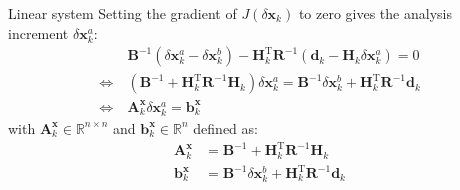\documentclass[8pt]{beamer}
\begin{document}
\begin{frame}{Linear system}
Setting the gradient of $J(\delta \mathbf{x}_k)$ to zero gives the analysis increment $\delta \mathbf{x}^a_k$:
\begin{align}
\label{eq:inc}
& \ \mathbf{B}^{-1} \left(\delta \mathbf{x}^a_k - \delta \mathbf{x}^b_k\right) - \mathbf{H}_k^\mathrm{T} \mathbf{R}^{-1} \left(\mathbf{d}_k - \mathbf{H}_k \delta \mathbf{x}^a_k\right) = 0 \nonumber \\
\Leftrightarrow & \ \left(\mathbf{B}^{-1} + \mathbf{H}_k^\mathrm{T} \mathbf{R}^{-1} \mathbf{H}_k\right) \delta \mathbf{x}^a_k = \mathbf{B}^{-1} \delta \mathbf{x}^b_k + \mathbf{H}_k^\mathrm{T} \mathbf{R}^{-1} \mathbf{d}_k \nonumber \\
\Leftrightarrow & \ \boxed{\mathbf{A}^\mathbf{x}_k \delta \mathbf{x}^a_k = \mathbf{b}^\mathbf{x}_k}
\end{align}
with $\mathbf{A}^\mathbf{x}_k \in \mathbb{R}^{n \times n}$ and $\mathbf{b}^\mathbf{x}_k \in \mathbb{R}^{n}$ defined as:
\begin{align}
\mathbf{A}^\mathbf{x}_k & = \mathbf{B}^{-1} + \mathbf{H}_k^\mathrm{T} \mathbf{R}^{-1} \mathbf{H}_k \\
\mathbf{b}^\mathbf{x}_k & = \mathbf{B}^{-1} \delta \mathbf{x}^b_k + \mathbf{H}_k^\mathrm{T} \mathbf{R}^{-1} \mathbf{d}_k
\end{align}
\end{frame}
\end{document}
